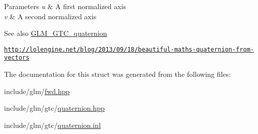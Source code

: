 \begin{DoxyParams}{Parameters}
{\em u} & A first normalized axis \\
\hline
{\em v} & A second normalized axis \\
\hline
\end{DoxyParams}
\begin{DoxySeeAlso}{See also}
\hyperlink{group__gtc__quaternion}{G\+L\+M\+\_\+\+G\+T\+C\+\_\+quaternion} 

\href{http://lolengine.net/blog/2013/09/18/beautiful-maths-quaternion-from-vectors}{\tt http\+://lolengine.\+net/blog/2013/09/18/beautiful-\/maths-\/quaternion-\/from-\/vectors} 
\end{DoxySeeAlso}


The documentation for this struct was generated from the following files\+:\begin{DoxyCompactItemize}
\item 
include/glm/\hyperlink{fwd_8hpp}{fwd.\+hpp}\item 
include/glm/gtc/\hyperlink{gtc_2quaternion_8hpp}{quaternion.\+hpp}\item 
include/glm/gtc/\hyperlink{gtc_2quaternion_8inl}{quaternion.\+inl}\end{DoxyCompactItemize}
